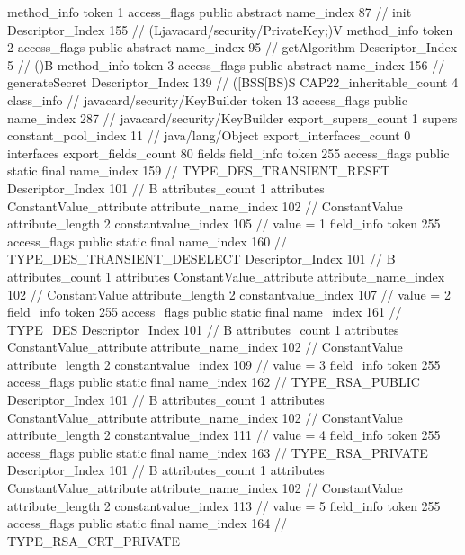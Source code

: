 {{{{				method_info {
					token	1
					access_flags	public abstract
					name_index	87		// init
					Descriptor_Index	155		// (Ljavacard/security/PrivateKey;)V
				}
				method_info {
					token	2
					access_flags	public abstract
					name_index	95		// getAlgorithm
					Descriptor_Index	5		// ()B
				}
				method_info {
					token	3
					access_flags	public abstract
					name_index	156		// generateSecret
					Descriptor_Index	139		// ([BSS[BS)S
				}
			}
			CAP22_inheritable_count	4
		}
		class_info {		// javacard/security/KeyBuilder
			token	13
			access_flags	public
			name_index	287		// javacard/security/KeyBuilder
			export_supers_count	1
			supers {
				constant_pool_index	11		// java/lang/Object
			}
			export_interfaces_count	0
			interfaces {
			}
			export_fields_count	80
			fields {
			field_info {
				token	255
				access_flags	public static final
				name_index	159		// TYPE_DES_TRANSIENT_RESET
				Descriptor_Index	101		// B
				attributes_count	1
				attributes {
				ConstantValue_attribute {
					attribute_name_index	102		// ConstantValue
					attribute_length	2
					constantvalue_index	105		// value = 1
				}
				}
			}
			field_info {
				token	255
				access_flags	public static final
				name_index	160		// TYPE_DES_TRANSIENT_DESELECT
				Descriptor_Index	101		// B
				attributes_count	1
				attributes {
				ConstantValue_attribute {
					attribute_name_index	102		// ConstantValue
					attribute_length	2
					constantvalue_index	107		// value = 2
				}
				}
			}
			field_info {
				token	255
				access_flags	public static final
				name_index	161		// TYPE_DES
				Descriptor_Index	101		// B
				attributes_count	1
				attributes {
				ConstantValue_attribute {
					attribute_name_index	102		// ConstantValue
					attribute_length	2
					constantvalue_index	109		// value = 3
				}
				}
			}
			field_info {
				token	255
				access_flags	public static final
				name_index	162		// TYPE_RSA_PUBLIC
				Descriptor_Index	101		// B
				attributes_count	1
				attributes {
				ConstantValue_attribute {
					attribute_name_index	102		// ConstantValue
					attribute_length	2
					constantvalue_index	111		// value = 4
				}
				}
			}
			field_info {
				token	255
				access_flags	public static final
				name_index	163		// TYPE_RSA_PRIVATE
				Descriptor_Index	101		// B
				attributes_count	1
				attributes {
				ConstantValue_attribute {
					attribute_name_index	102		// ConstantValue
					attribute_length	2
					constantvalue_index	113		// value = 5
				}
				}
			}
			field_info {
				token	255
				access_flags	public static final
				name_index	164		// TYPE_RSA_CRT_PRIVATE
}}}}}

